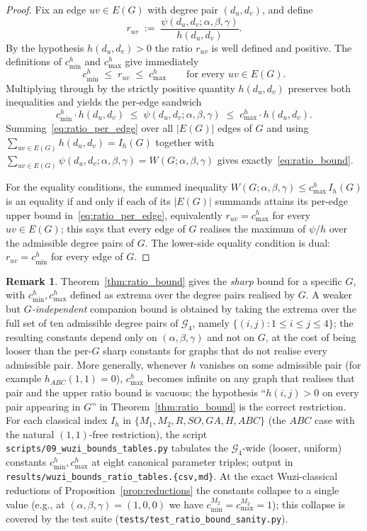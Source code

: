 \documentclass[11pt,a4paper]{article}
\theoremstyle{definition}
\newtheorem{remark}[theorem]{Remark}
\newcommand{\Wuzi}{W(G;\alpha,\beta,\gamma)}
\begin{document}
\begin{proof}
Fix an edge $uv\in E(G)$ with degree pair $(d_u,d_v)$, and define
\[
r_{uv} \;:=\; \frac{\psi(d_u,d_v;\alpha,\beta,\gamma)}{h(d_u,d_v)}.
\]
By the hypothesis $h(d_u,d_v)>0$ the ratio $r_{uv}$ is well defined
and positive. The definitions of $c_{\min}^{h}$ and $c_{\max}^{h}$
give immediately
\[
c_{\min}^{h} \;\le\; r_{uv} \;\le\; c_{\max}^{h}
\qquad\text{for every }uv\in E(G).
\]
Multiplying through by the strictly positive quantity $h(d_u,d_v)$
preserves both inequalities and yields the per-edge sandwich
\begin{equation}\label{eq:ratio_per_edge}
c_{\min}^{h}\cdot h(d_u,d_v) \;\le\; \psi(d_u,d_v;\alpha,\beta,\gamma)
\;\le\; c_{\max}^{h}\cdot h(d_u,d_v).
\end{equation}
Summing~\eqref{eq:ratio_per_edge} over all $|E(G)|$ edges of $G$ and
using $\sum_{uv\in E(G)} h(d_u,d_v) = I_{h}(G)$ together with
$\sum_{uv\in E(G)} \psi(d_u,d_v;\alpha,\beta,\gamma) = \Wuzi$ gives
exactly~\eqref{eq:ratio_bound}.

For the equality conditions, the summed inequality
$\Wuzi \le c_{\max}^{h}\,I_{h}(G)$ is an equality if and only if each
of its $|E(G)|$ summands attains its per-edge upper bound
in~\eqref{eq:ratio_per_edge}, equivalently $r_{uv}=c_{\max}^{h}$ for
every $uv\in E(G)$; this says that every edge of $G$ realises the
maximum of $\psi/h$ over the admissible degree pairs of $G$. The
lower-side equality condition is dual: $r_{uv}=c_{\min}^{h}$ for
every edge of $G$.
\end{proof}

\begin{remark}\label{rem:ratio_bound_practice}
Theorem~\ref{thm:ratio_bound} gives the \emph{sharp} bound for a
specific $G$, with $c_{\min}^h, c_{\max}^h$ defined as extrema over
the degree pairs realised by $G$. A weaker but \emph{$G$-independent}
companion bound is obtained by taking the extrema over the full set
of ten admissible degree pairs of $\mathcal{G}_4$, namely
$\{(i, j) : 1 \le i \le j \le 4\}$; the resulting constants depend
only on $(\alpha, \beta, \gamma)$ and not on $G$, at the cost of
being looser than the per-$G$ sharp constants for graphs that do
not realise every admissible pair. More generally, whenever $h$
vanishes on some admissible pair (for example $h_{ABC}(1, 1) = 0$),
$c_{\max}^{h}$ becomes infinite on any graph that realises that
pair and the upper ratio bound is vacuous; the hypothesis
``$h(i, j) > 0$ on every pair appearing in $G$'' in
Theorem~\ref{thm:ratio_bound} is the correct restriction. For each
classical index $I_h$ in $\{M_1, M_2, R, SO, GA, H, ABC\}$ (the
$ABC$ case with the natural $(1, 1)$-free restriction), the script
\texttt{scripts/09\_wuzi\_bounds\_tables.py} tabulates the
$\mathcal{G}_4$-wide (looser, uniform) constants
$c_{\min}^{h}, c_{\max}^{h}$ at eight canonical parameter triples;
output in \texttt{results/wuzi\_bounds\_ratio\_tables.\{csv,md\}}.
At the exact Wuzi-classical reductions of
Proposition~\ref{prop:reductions} the constants collapse to a
single value (e.g., at $(\alpha, \beta, \gamma) = (1, 0, 0)$ we
have $c_{\min}^{M_2} = c_{\max}^{M_2} = 1$); this collapse is
covered by the test suite (\texttt{tests/test\_ratio\_bound\_sanity.py}).
\end{remark}
\end{document}
